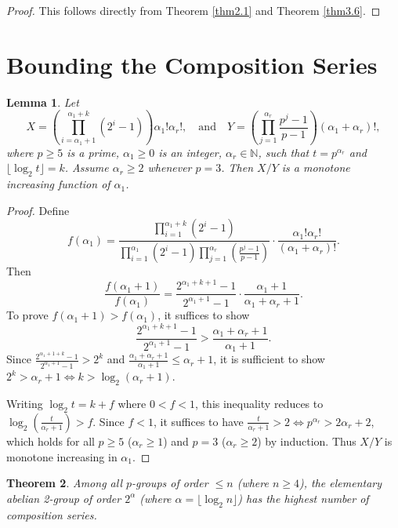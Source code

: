 \documentclass[11pt,a4paper]{article}
\newtheorem{theorem}{Theorem}[section]
\newtheorem{lemma}[theorem]{Lemma}
\theoremstyle{definition}
\begin{document}
\begin{proof}
This follows directly from Theorem \ref{thm2.1} and Theorem \ref{thm3.6}.
\end{proof}

\section{Bounding the Composition Series}

\begin{lemma}\label{lem4.1}
Let
\[
X = \left( \prod_{i=\alpha_1+1}^{\alpha_1+k} (2^i - 1) \right) \alpha_1! \alpha_r!, \quad \text{and} \quad Y = \left( \prod_{j=1}^{\alpha_r} \frac{p^j - 1}{p - 1} \right) (\alpha_1 + \alpha_r)!,
\]
where $p \ge 5$ is a prime, $\alpha_1 \ge 0$ is an integer, $\alpha_r \in \mathbb{N}$, such that $t = p^{\alpha_r}$ and $\lfloor \log_2 t \rfloor = k$. Assume $\alpha_r \ge 2$ whenever $p = 3$. Then $X/Y$ is a monotone increasing function of $\alpha_1$.
\end{lemma}

\begin{proof}
Define
\[
f(\alpha_1) = \frac{\prod_{i=1}^{\alpha_1+k}(2^i - 1)}{\prod_{i=1}^{\alpha_1}(2^i - 1) \prod_{j=1}^{\alpha_r}\left(\frac{p^j-1}{p-1}\right)} \cdot \frac{\alpha_1! \alpha_r!}{(\alpha_1 + \alpha_r)!}.
\]
Then
\[
\frac{f(\alpha_1 + 1)}{f(\alpha_1)} = \frac{2^{\alpha_1+k+1} - 1}{2^{\alpha_1+1} - 1} \cdot \frac{\alpha_1 + 1}{\alpha_1 + \alpha_r + 1}.
\]
To prove $f(\alpha_1 + 1) > f(\alpha_1)$, it suffices to show
\[
\frac{2^{\alpha_1+k+1} - 1}{2^{\alpha_1+1} - 1} > \frac{\alpha_1 + \alpha_r + 1}{\alpha_1 + 1}.
\]
Since $\frac{2^{\alpha_1+1+k} - 1}{2^{\alpha_1+1} - 1} > 2^k$ and $\frac{\alpha_1+\alpha_r+1}{\alpha_1+1} \le \alpha_r + 1$, it is sufficient to show $2^k > \alpha_r + 1 \iff k > \log_2(\alpha_r + 1)$.

Writing $\log_2 t = k + f$ where $0 < f < 1$, this inequality reduces to $\log_2\left(\frac{t}{\alpha_r + 1}\right) > f$. Since $f < 1$, it suffices to have $\frac{t}{\alpha_r + 1} > 2 \iff p^{\alpha_r} > 2\alpha_r + 2$, which holds for all $p \ge 5$ ($\alpha_r \ge 1$) and $p = 3$ ($\alpha_r \ge 2$) by induction. Thus $X/Y$ is monotone increasing in $\alpha_1$.
\end{proof}

\begin{theorem}\label{thm4.2}
Among all $p$-groups of order $\le n$ (where $n \ge 4$), the elementary abelian 2-group of order $2^\alpha$ (where $\alpha = \lfloor \log_2 n \rfloor$) has the highest number of composition series.
\end{theorem}
\end{document}
